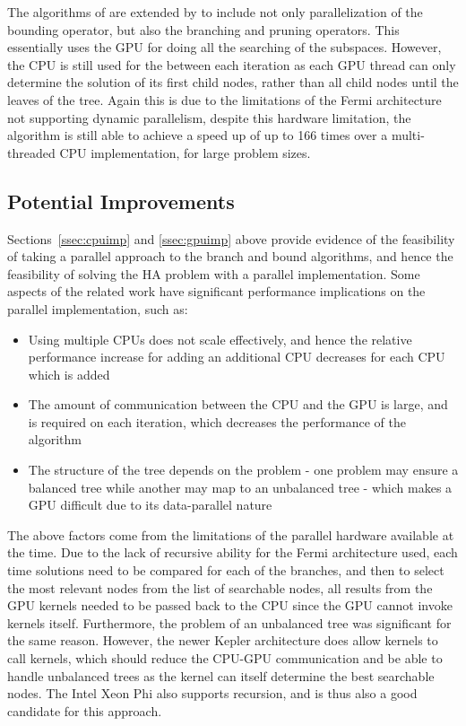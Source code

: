 \documentclass[10pt,twocolumn]{witseiepaper}
\begin{document}
The algorithms of \cite{melab:2012, chakroun:2012} are extended by \cite{chakroun:2013} to 
include not only parallelization of the bounding operator, but also the branching and pruning operators. This
essentially uses the GPU for doing all the searching of the subspaces. However, the CPU is still used for the
between each iteration as each GPU thread can only determine the solution of its first child nodes, rather 
than all child nodes until the leaves of the tree. Again this is due to the limitations of the Fermi 
architecture not supporting dynamic parallelism, despite this hardware limitation, the algorithm is still able
to achieve a speed up of up to 166 times over a multi-threaded CPU implementation, for large problem sizes.

\subsection{ Potential Improvements }

Sections~\ref{ssec:cpuimp} and \ref{ssec:gpuimp} above provide evidence of the feasibility of taking a
parallel approach to the branch and bound algorithms, and hence the feasibility of solving the HA problem with
a parallel implementation. Some aspects of the related work have significant performance implications on the
parallel implementation, such as:

\begin{itemize}
    \item{ Using multiple CPUs does not scale effectively, and hence the relative performance increase for
        adding an additional CPU decreases for each CPU which is added
    }
    \item{ The amount of communication between the CPU and the GPU is large, and is required on each
            iteration, which decreases the performance of the algorithm
    }
    \item{ The structure of the tree depends on the problem - one problem may ensure a balanced tree while
            another may map to an unbalanced tree - which makes a GPU difficult due to its data-parallel
            nature
    }
\end{itemize}

The above factors come from the limitations of the parallel hardware available at the time. Due to the lack of
recursive ability for the Fermi architecture used, each time solutions need to be compared for each of the
branches, and then to select the most relevant nodes from the list of searchable nodes, all results from the
GPU kernels needed to be passed back to the CPU since the GPU cannot invoke kernels itself. Furthermore, the 
problem of an unbalanced tree was significant for the same reason. However, the newer Kepler architecture does
allow kernels to call kernels, which should reduce the CPU-GPU communication and be able to handle unbalanced
trees as the kernel can itself determine the best searchable nodes. The Intel Xeon Phi also supports
recursion, and is thus also a good candidate for this approach.
\end{document}
